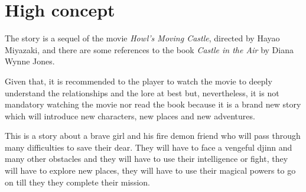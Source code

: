 \section{High concept}

The story is a sequel of the movie \textit{Howl’s Moving Castle}, directed by Hayao Miyazaki, and there are some references to the book \textit{Castle in the Air} by Diana Wynne Jones.

Given that, it is recommended to the player to watch the movie to deeply understand the relationships and the lore at best but, nevertheless, it is not mandatory watching the movie nor read the book because it is a brand new story which will introduce new characters, new places and new adventures.

This is a story about a brave girl and his fire demon friend who will pass through many difficulties to save their dear. They will have to face a vengeful djinn and many other obstacles and they will have to use their intelligence or fight, they will have to explore new places, they  will have to use their magical powers to go on till they they complete their mission. 


